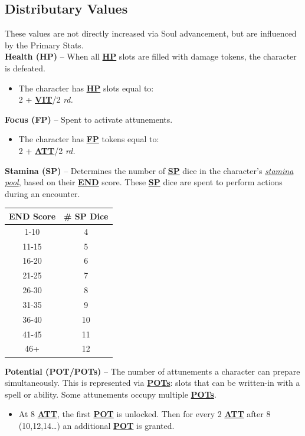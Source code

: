 \documentclass[12pt]{article}
\newcommand{\refto}[1]{\hyperlink{#1}{\textbf{#1}}}
\newcommand{\makeref}[1]{\hypertarget{#1}{\textbf{#1}}}
\newcommand{\reftoit}[1]{\hyperlink{#1}{\emph{#1}}}
\begin{document}
\begin{multicols*}{2}
\vfill

\subsection{Distributary Values}
These values are not directly increased via Soul advancement, but are influenced by the Primary Stats.\\

\textbf{Health (\makeref{HP})} – When all \refto{HP} slots are filled with damage tokens, the character is defeated.
\begin{itemize}
\item The character has \refto{HP} slots equal to:\\
2 + \refto{VIT}/2 \emph{rd.}
\end{itemize}

\textbf{Focus (\makeref{FP})} – Spent to activate attunements.
\begin{itemize}
\item The character has \refto{FP} tokens equal to:\\
2 + \refto{ATT}/2 \emph{rd.}
\end{itemize}

\setlength{\tabcolsep}{11pt}
\renewcommand{\arraystretch}{1.2}

\textbf{Stamina (\makeref{SP})} – Determines the number of \refto{SP} dice in the character’s \reftoit{stamina pool}, based on their \refto{END} score. These \refto{SP} dice are spent to perform actions during an encounter.
\begin{center}
\begin{tabular}{ |c|c| }
\hline
\textbf{END Score} & \textbf{\# SP Dice}\\
\hline
1-10 & 4\\
\hline
11-15 & 5\\
\hline
16-20 & 6\\
\hline
21-25 & 7\\
\hline
26-30 & 8\\
\hline
31-35 & 9\\
\hline
36-40 & 10\\
\hline
41-45 & 11\\
\hline
46+ & 12\\
\hline
\end{tabular}
\end{center}

\textbf{Potential (\makeref{POT}/\makeref{POTs})} – The number of attunements a character can prepare simultaneously. This is represented via \refto{POTs}: slots that can be written-in with a spell or ability. Some attunements occupy multiple \refto{POTs}.
\begin{itemize}
\item At 8 \refto{ATT}, the first \refto{POT} is unlocked. Then for every 2 \refto{ATT} after 8 (10,12,14…) an additional \refto{POT} is granted.
\end{itemize}


\end{multicols*}
\end{document}
